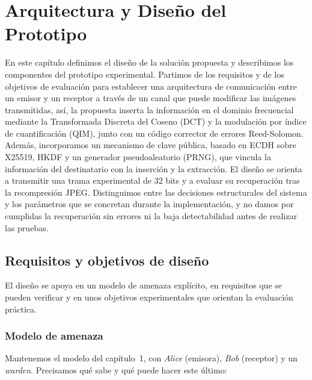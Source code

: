 \documentclass[IB]{TFUOC}%
\begin{document}
\chapter{Arquitectura y Diseño del Prototipo}
\label{chap:diseno_solucion}

En este capítulo definimos el diseño de la solución propuesta y describimos los componentes del prototipo experimental. Partimos de los requisitos y de los objetivos de evaluación para establecer una arquitectura de comunicación entre un emisor y un receptor a través de un canal que puede modificar las imágenes transmitidas, así, la propuesta inserta la información en el dominio frecuencial mediante la Transformada Discreta del Coseno (DCT) y la modulación por índice de cuantificación (QIM), junto con un código corrector de errores Reed-Solomon. Además, incorporamos un mecanismo de clave pública, basado en ECDH sobre X25519, HKDF y un generador pseudoaleatorio (PRNG), que vincula la información del destinatario con la inserción y la extracción. El diseño se orienta a transmitir una trama experimental de 32 bits y a evaluar su recuperación tras la recompresión JPEG. Distinguimos entre las decisiones estructurales del sistema y los parámetros que se concretan durante la implementación, y no damos por cumplidas la recuperación sin errores ni la baja detectabilidad antes de realizar las pruebas.

\section{Requisitos y objetivos de diseño}
\label{sec:requisitos_diseno}

El diseño se apoya en un modelo de amenaza explícito, en requisitos que se pueden verificar y en unos objetivos experimentales que orientan la evaluación práctica.

\subsection{Modelo de amenaza}
\label{subsec:modelo_amenaza}

Mantenemos el modelo del capítulo~1, con \textit{Alice} (emisora), \textit{Bob} (receptor) y un \textit{warden}. Precisamos qué sabe y qué puede hacer este último:
\end{document}
